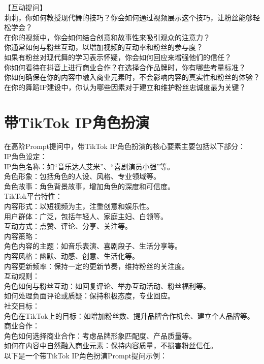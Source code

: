 \documentclass[12pt]{book}
\begin{document}
【互动提问】\\

莉莉，你如何教授现代舞的技巧？你会如何通过视频展示这个技巧，让粉丝能够轻松学会？\\
在你的视频中，你会如何结合创意和故事性来吸引观众的注意力？\\
你通常如何与粉丝互动，以增加视频的互动率和粉丝的参与度？\\
如果有粉丝对现代舞的学习表示怀疑，你会如何回应来增强他们的信任？\\
你如何看待在抖音上进行商业合作？在选择合作品牌时，你有哪些考量标准？\\
你如何确保在你的内容中融入商业元素时，不会影响内容的真实性和粉丝的体验？\\
在你的舞蹈IP建设中，你认为哪些因素对于建立和维护粉丝忠诚度最为关键？\\

\section{带TikTok IP角色扮演}

在高阶Prompt提问中，带TikTok IP角色扮演的核心要素主要包括以下部分：\\

IP角色设定：\\
IP角色名称：如“音乐达人艾米”、“喜剧演员小强”等。\\
角色形象：包括角色的人设、风格、专业领域等。\\
角色故事：角色背景故事，增加角色的深度和可信度。\\
TikTok平台特性：\\
内容形式：以短视频为主，注重创意和娱乐性。\\
用户群体：广泛，包括年轻人、家庭主妇、白领等。\\
互动方式：点赞、评论、分享、关注等。\\
内容策略：\\
角色内容的主题：如音乐表演、喜剧段子、生活分享等。\\
内容风格：幽默、动感、创意、生活化等。\\
内容更新频率：保持一定的更新节奏，维持粉丝的关注度。\\
互动规则：\\
角色如何与粉丝互动：如回复评论、举办互动活动、粉丝福利等。\\
如何处理负面评论或质疑：保持积极态度，专业回应。\\
社交目标：\\
角色在TikTok上的目标：如增加粉丝数、提升品牌合作机会、建立个人品牌等。\\
商业合作：\\
角色如何选择商业合作：考虑品牌形象匹配度、产品质量等。\\
如何在内容中自然融入商业元素：保持内容质量，不损害粉丝信任。\\
以下是一个带TikTok IP角色扮演Prompt提问示例：\\
\end{document}
